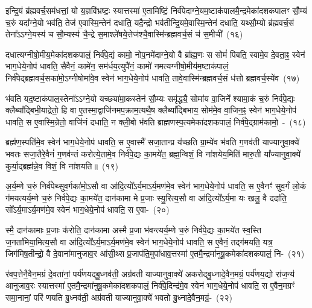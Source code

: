 इन्द्रि॒यं ब्र॑ह्मवर्च॒सम॑धत्तां॒ यो य॒ज्ञवि॑भ्रष्टः॒ स्यात्तस्मा॑ ए॒तामिष्टिं॒ निर्व॑पेदाग्ने॒यम॒ष्टाक॑पालमै॒न्द्रमेका॑\-दश\-कपालꣳ सौ॒म्यं च॒रुं यदा᳚ग्ने॒यो भव॑ति॒ तेज॑ ए॒वास्मि॒न्तेन॑ दधाति॒ यदै॒न्द्रो भव॑तीन्द्रि॒यमे॒वास्मि॒न्तेन॑ दधाति॒ यथ्सौ॒म्यो ब्र॑ह्मवर्च॒सं तेना᳚\-ऽऽ\-ग्ने॒यस्य॑ च सौ॒म्यस्य॑ चै॒न्द्रे स॒माश्ले॑षये॒त्तेज॑श्चै॒वास्मि॑न्ब्रह्मवर्च॒सं च॑ स॒मीची॑~(१६)

दधात्यग्नीषो॒मीय॒मेका॑\-दश\-कपालं॒ निर्व॑पे॒द्यं कामो॒ नोप॒नमे॑दा\-ग्ने॒यो वै ब्रा᳚ह्म॒णः स सोमं॑ पिबति॒ स्वामे॒व दे॒वता॒ꣴ॒ स्वेन॑ भाग॒धेये॒नोप॑ धावति॒ सैवैनं॒ कामे॑न॒ सम॑र्धय॒त्युपै॑नं॒ कामो॑ नमत्यग्नीषो॒मीय॑म॒ष्टा\-क॑पालं॒ निर्व॑पेद्ब्रह्मवर्च॒सका॑मो॒\-ऽग्नी\-षोमा॑वे॒व स्वेन॑ भाग॒धेये॒नोप॑ धावति॒ तावे॒वास्मि॑न्ब्रह्मवर्च॒सं ध॑त्तो ब्रह्मवर्च॒स्ये॑व~(१७)

भ॑वति यद॒ष्टाक॑पाल॒स्तेना᳚\-ऽऽ\-ग्ने॒यो यच्छ्या॑मा॒कस्तेन॑ सौ॒म्यः समृ॑द्ध्यै॒ सोमा॑य वा॒जिने᳚ श्यामा॒कं च॒रुं निर्व॑पे॒द्यः क्लैब्या᳚द्बिभी॒याद्रेतो॒ हि वा ए॒तस्मा॒द्वाजि॑नमप॒क्राम॒त्यथै॒ष क्लैब्या᳚द्बिभाय॒ सोम॑मे॒व वा॒जिन॒ꣴ॒ स्वेन॑ भाग॒धेये॒नोप॑ धावति॒ स ए॒वास्मि॒न्रेतो॒ वाजि॑नं दधाति॒ न क्ली॒बो भ॑वति ब्राह्मणस्प॒त्यमेका॑\-दश\-कपालं॒ निर्व॑पे॒द्ग्राम॑कामो॒~-~(१८)

ब्रह्म॑ण॒स्पति॑मे॒व स्वेन॑ भाग॒धेये॒नोप॑ धावति॒ स ए॒वास्मै॑ सजा॒तान्प्र य॑च्छति ग्रा॒म्ये॑व भ॑वति ग॒णव॑ती याज्यानुवा॒क्ये॑ भवतः सजा॒तैरे॒वैनं॑ ग॒णव॑न्तं करोत्ये॒तामे॒व निर्व॑पे॒द्यः का॒मये॑त॒ ब्रह्म॒न्विशं॒ वि ना॑शयेय॒मिति॑ मारु॒ती या᳚ज्यानुवा॒क्ये॑ कुर्या॒द्ब्रह्म॑न्ने॒व विशं॒ वि ना॑शयति॥~(१९)

{}%

अ॒र्य॒म्णे च॒रुं निर्व॑पेथ्सुव॒र्गका॑मो॒\-ऽसौ वा आ॑दि॒त्यो᳚\-ऽर्य॒मा\-ऽर्य॒मण॑मे॒व स्वेन॑ भाग॒धेये॒नोप॑ धावति॒ स ए॒वैनꣳ॑ सुव॒र्गं लो॒कं ग॑मयत्यर्य॒म्णे च॒रुं निर्व॑पे॒द्यः का॒मये॑त॒ दान॑कामा मे प्र॒जाः स्यु॒रित्य॒सौ वा आ॑दि॒त्यो᳚\-ऽर्य॒मा यः खलु॒ वै ददा॑ति॒ सो᳚\-ऽर्य॒मा\-ऽर्य॒मण॑मे॒व स्वेन॑ भाग॒धेये॒नोप॑ धावति॒ स ए॒वा-~(२०)

स्मै॒ दान॑कामाः प्र॒जाः क॑रोति॒ दान॑कामा अस्मै प्र॒जा भ॑वन्त्यर्य॒म्णे च॒रुं निर्व॑पे॒द्यः का॒मये॑त स्व॒स्ति ज॒नता॑मिया॒मित्य॒सौ वा आ॑दि॒त्यो᳚\-ऽर्य॒मा\-ऽर्य॒मण॑मे॒व स्वेन॑ भाग॒धेये॒नोप॑ धावति॒ स ए॒वैनं॒ तद्ग॑मयति॒ यत्र॒ जिग॑मिष॒तीन्द्रो॒ वै दे॒वाना॑मानुजाव॒र आ॑सी॒थ्स प्र॒जा\-प॑ति॒मुपा॑धाव॒त्तस्मा॑ ए॒तमै॒न्द्रमा॑नुषू॒कमेका॑\-दश\-कपालं॒ नि-~(२१)

र॑वप॒त्तेनै॒वैन॒मग्रं॑ दे॒वता॑नां॒ पर्य॑णयद्बु॒ध्नव॑ती॒ अग्र॑वती याज्यानुवा॒क्ये॑ अकरोद्बु॒ध्नादे॒वैन॒मग्रं॒ पर्य॑णय॒द्यो रा॑ज॒न्य॑ आनुजाव॒रः स्यात्तस्मा॑ ए॒तमै॒न्द्रमा॑नुषू॒कमेका॑\-दश\-कपालं॒ निर्व॑पे॒दिन्द्र॑मे॒व स्वेन॑ भाग॒धेये॒नोप॑ धावति॒ स ए॒वैन॒मग्रꣳ॑ समा॒नानां॒ परि॑ णयति बु॒ध्नव॑ती॒ अग्र॑वती याज्यानुवा॒क्ये॑ भवतो बु॒ध्नादे॒वैन॒मग्रं॒-~(२२)


